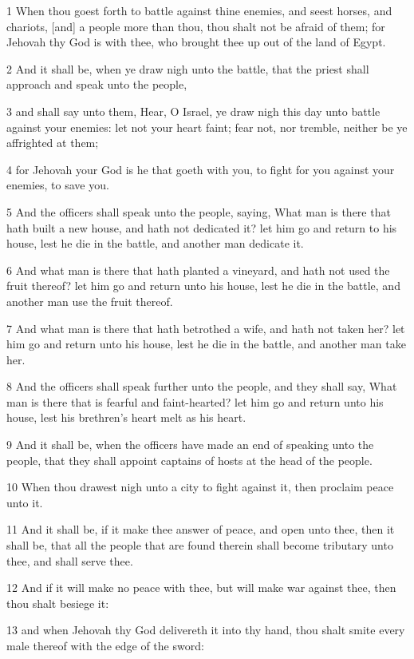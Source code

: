 \par 1 When thou goest forth to battle against thine enemies, and seest horses, and chariots, [and] a people more than thou, thou shalt not be afraid of them; for Jehovah thy God is with thee, who brought thee up out of the land of Egypt.
\par 2 And it shall be, when ye draw nigh unto the battle, that the priest shall approach and speak unto the people,
\par 3 and shall say unto them, Hear, O Israel, ye draw nigh this day unto battle against your enemies: let not your heart faint; fear not, nor tremble, neither be ye affrighted at them;
\par 4 for Jehovah your God is he that goeth with you, to fight for you against your enemies, to save you.
\par 5 And the officers shall speak unto the people, saying, What man is there that hath built a new house, and hath not dedicated it? let him go and return to his house, lest he die in the battle, and another man dedicate it.
\par 6 And what man is there that hath planted a vineyard, and hath not used the fruit thereof? let him go and return unto his house, lest he die in the battle, and another man use the fruit thereof.
\par 7 And what man is there that hath betrothed a wife, and hath not taken her? let him go and return unto his house, lest he die in the battle, and another man take her.
\par 8 And the officers shall speak further unto the people, and they shall say, What man is there that is fearful and faint-hearted? let him go and return unto his house, lest his brethren's heart melt as his heart.
\par 9 And it shall be, when the officers have made an end of speaking unto the people, that they shall appoint captains of hosts at the head of the people.
\par 10 When thou drawest nigh unto a city to fight against it, then proclaim peace unto it.
\par 11 And it shall be, if it make thee answer of peace, and open unto thee, then it shall be, that all the people that are found therein shall become tributary unto thee, and shall serve thee.
\par 12 And if it will make no peace with thee, but will make war against thee, then thou shalt besiege it:
\par 13 and when Jehovah thy God delivereth it into thy hand, thou shalt smite every male thereof with the edge of the sword:

